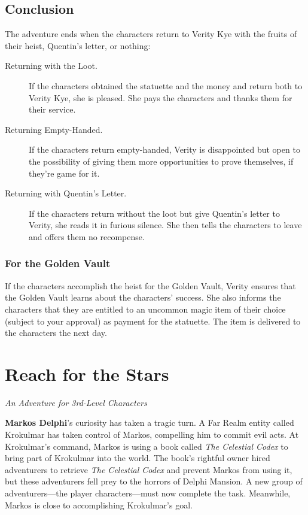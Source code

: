 \documentclass[10pt,a4paper,twoside,bg=print,twocolumn,openany,nodeprecatedcode]{dndbook}
\begin{document}
\section{Conclusion}
The adventure ends when the characters return to Verity Kye with the fruits of their heist, Quentin's letter, or nothing:


\begin{description}
\item[Returning with the Loot.]
If the characters obtained the statuette and the money and return both to Verity Kye, she is pleased. She pays the characters and thanks them for their service.
\item[Returning Empty-Handed.]
If the characters return empty-handed, Verity is disappointed but open to the possibility of giving them more opportunities to prove themselves, if they're game for it.
\item[Returning with Quentin's Letter.]
If the characters return without the loot but give Quentin's letter to Verity, she reads it in furious silence. She then tells the characters to leave and offers them no recompense.
\end{description}

\subsection{For the Golden Vault}
If the characters accomplish the heist for the Golden Vault, Verity ensures that the Golden Vault learns about the characters' success. She also informs the characters that they are entitled to an uncommon magic item of their choice (subject to your approval) as payment for the statuette. The item is delivered to the characters the next day.

\chapter{Reach for the Stars}
\textit{An Adventure for 3rd-Level Characters}

\textbf{Markos Delphi}'s curiosity has taken a tragic turn. A Far Realm entity called Krokulmar has taken control of Markos, compelling him to commit evil acts. At Krokulmar's command, Markos is using a book called \textit{The Celestial Codex} to bring part of Krokulmar into the world. The book's rightful owner hired adventurers to retrieve \textit{The Celestial Codex} and prevent Markos from using it, but these adventurers fell prey to the horrors of Delphi Mansion. A new group of adventurers—the player characters—must now complete the task. Meanwhile, Markos is close to accomplishing Krokulmar's goal.
\end{document}
